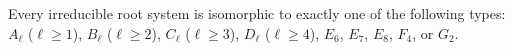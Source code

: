 Every irreducible root system is isomorphic to exactly one of the following types: $A_\ell$ ($\ell \geq 1$), $B_\ell$ ($\ell \geq 2$), $C_\ell$ ($\ell \geq 3$), $D_\ell$ ($\ell \geq 4$), $E_6$, $E_7$, $E_8$, $F_4$, or $G_2$.
